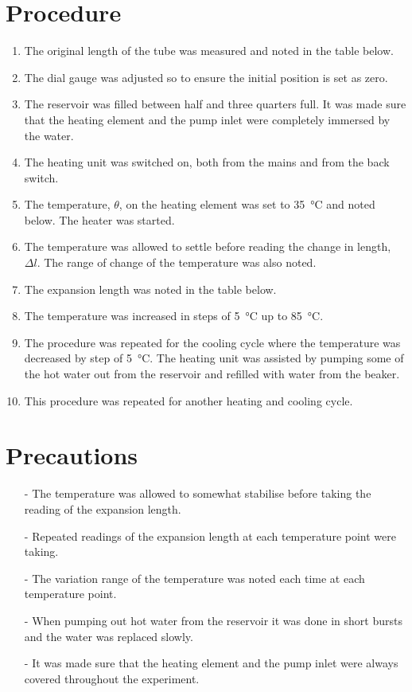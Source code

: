 \documentclass[12pt, a4paper]{article}
\begin{document}
\section*{Procedure}
\begin{enumerate}
    \item The original length of the tube was measured and noted in the table below.
    \item The dial gauge was adjusted so to ensure the initial position is set as zero.
    \item The reservoir was filled between half and three quarters full. It was made sure that the heating element and the pump inlet were completely immersed by the water.
    \item The heating unit was switched on, both from the mains and from the back switch.
    \item The temperature, $\theta$, on the heating element was set to \qty{35}{\degreeCelsius} and noted below. The heater was started.
    \item The temperature was allowed to settle before reading the change in length, $\Delta l$. The range of change of the temperature was also noted.
    \item The expansion length was noted in the table below.
    \item The temperature was increased in steps of \qty{5}{\degreeCelsius} up to \qty{85}{\degreeCelsius}.
    \item The procedure was repeated for the cooling cycle where the temperature was decreased by step of \qty{5}{\degreeCelsius}. The heating unit was assisted by pumping some of the hot water out from the reservoir and refilled with water from the beaker.
    \item This procedure was repeated for another heating and cooling cycle.
\end{enumerate}

\section*{Precautions}
\begin{itemize}
    \item[-] The temperature was allowed to somewhat stabilise before taking the reading of the expansion length.
    \item[-] Repeated readings of the expansion length at each temperature point were taking.
    \item[-] The variation range of the temperature was noted each time at each temperature point.
    \item[-] When pumping out hot water from the reservoir it was done in short bursts and the water was replaced slowly.
    \item[-] It was made sure that the heating element and the pump inlet were always covered throughout the experiment.
\end{itemize}
\end{document}
